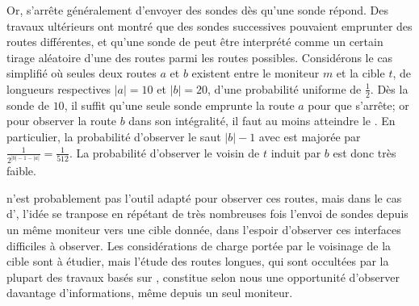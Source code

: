 Or, \traceroute s'arrête généralement d'envoyer des sondes dès qu'une sonde
\icmp répond. Des travaux ultérieurs ont montré que des sondes \icmp successives
pouvaient emprunter des routes différentes, et qu'une sonde de \traceroute peut
être interprété comme un certain tirage aléatoire d'une des routes parmi les
routes possibles. Considérons le cas simplifié où seules deux routes $a$ et $b$
existent entre le moniteur $m$ et la cible $t$, de longueurs respectives $|a| =
10$ et $|b| = 20$, d'une probabilité uniforme de $\frac{1}{2}$. Dès la sonde de
\ttl $10$, il suffit qu'une seule sonde emprunte la route $a$ pour que
\traceroute s'arrête; or pour observer la route $b$ dans son intégralité, il
faut au moins atteindre le . En particulier, la probabilité d'observer le
saut $|b| - 1$ avec \traceroute est majorée par $\frac{1}{2^{|b| - 1 - |a|}}
= \frac{1}{512}$. La probabilité d'observer le voisin de $t$ induit par $b$ est
donc très faible.

\traceroute n'est probablement pas l'outil adapté pour observer ces routes, mais
dans le cas d'\udpping, l'idée se tranpose en répétant de très nombreuses fois
l'envoi de sondes depuis un même moniteur vers une cible donnée, dans l'espoir
d'observer ces interfaces difficiles à observer. Les considérations de charge
portée par le voisinage de la cible sont à étudier, mais l'étude des routes
longues, qui sont occultées par la plupart des travaux basés sur \traceroute,
constitue selon nous une opportunité d'observer davantage d'informations, même
depuis un seul moniteur.

